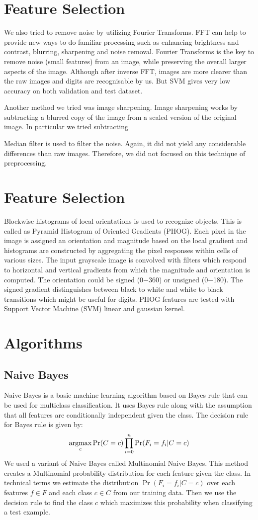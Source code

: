 \documentclass[10pt,twocolumn]{article}
\newcommand{\argmax}{\operatornamewithlimits{argmax}}
\begin{document}
\section{Feature Selection}
We also tried to remove noise by utilizing Fourier Transforms. FFT can help to provide new ways to do familiar processing such as enhancing brightness and contrast, blurring, sharpening and noise removal. Fourier Transforms is the key to remove noise (small features) from an image, while preserving the overall larger aspects of the image. Although after inverse FFT, images are more clearer than the raw images and digits are recognisable by us. But SVM gives very low accuracy on both validation and test dataset.

Another method we tried was image sharpening. Image sharpening works by subtracting a blurred copy of the image from a scaled version of the original image. In particular we tried subtracting 

Median filter is used to filter the noise. Again, it did not yield any considerable differences than raw images. Therefore, we did not focused on this technique of preprocessing.
\section{Feature Selection}
\cite {Maji09fastand} Blockwise histograms of local orientations is used to recognize objects. This is called as Pyramid Histogram of Oriented Gradients (PHOG). Each pixel in the image is assigned an orientation and magnitude based on the local gradient and histograms are constructed by aggregating the pixel responses within cells of various sizes. The input grayscale image is convolved with filters which respond to horizontal and vertical gradients from which the magnitude and orientation is computed. The orientation could be signed (0−360) or unsigned (0−180). The signed gradient distinguishes between black to white and white to black transitions which might be useful for digits. PHOG features are tested with Support Vector Machine (SVM) linear and gaussian kernel. 
\section{Algorithms}
\subsection{Naive Bayes}
Naive Bayes is a basic machine learning algorithm based on Bayes rule that can be used for multiclass classification. It uses Bayes rule along with the assumption that all features are conditionally independent given the class. The decision rule for Bayes rule is given by:
\[ \argmax_c \Pr(C = c) \prod_{i=0}^{n} \Pr(F_i = f_i | C = c)\]
We used a variant of Naive Bayes called Multinomial Naive Bayes. This method creates a Multinomial probability distribution for each feature given the class. In technical terms we estimate the distribution $\Pr(F_i = f_i | C = c)$ over each features $f \in F$ and each class $ c \in C$ from our training data. Then we use the decision rule to find the class $c$ which maximizes this probability when classifying a test example.
\end{document}
